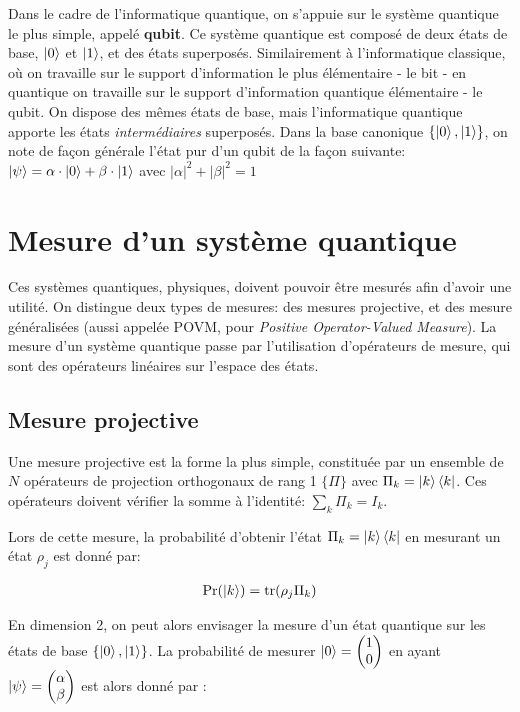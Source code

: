 \medbreak

Dans le cadre de l'informatique quantique, on s'appuie sur le système quantique le plus simple, appelé \textbf{qubit}. Ce système quantique est composé de deux états de base, $\ket{0}$ et $\ket{1}$, et des états superposés. Similairement à l'informatique classique, où on travaille sur le support d'information le plus élémentaire - le bit - en quantique on travaille sur le support d'information quantique élémentaire - le qubit. On dispose des mêmes états de base, mais l'informatique quantique apporte les états \textit{intermédiaires} superposés. Dans la base canonique $\{\ket{0}, \ket{1}\}$, on note de façon générale l'état pur d'un qubit de la façon suivante: $\ket{\psi} = \alpha \cdot \ket{0} + \beta \cdot \ket{1}$ avec $|\alpha|^2 + |\beta|^2 = 1$

\section{Mesure d'un système quantique}

Ces systèmes quantiques, physiques, doivent pouvoir être mesurés afin d'avoir une utilité. On distingue deux types de mesures: des mesures projective, et des mesure généralisées (aussi appelée POVM, pour \textit{Positive Operator-Valued Measure}). La mesure d'un système quantique passe par l'utilisation d'opérateurs de mesure, qui sont des opérateurs linéaires sur l'espace des états.

\subsection*{Mesure projective}

Une mesure projective est la forme la plus simple, constituée par un ensemble de $N$ opérateurs de projection orthogonaux de rang 1 $\{\Pi\}$ avec $\Pi_k = \ket{k} \bra{k}$. Ces opérateurs doivent vérifier la somme à l'identité: $\displaystyle \sum_k \Pi_k = I_k$. 

Lors de cette mesure, la probabilité d'obtenir l'état $\Pi_k = \ket{k}\bra{k}$ en mesurant un état $\rho_j$ est donné par:

\begin{align}
    \Pr(\ket{k}) = \operatorname{tr}(\rho_j \Pi_k)
\end{align}

En dimension 2, on peut alors envisager la mesure d'un état quantique sur les états de base $\{\ket{0}, \ket{1}\}$. La probabilité de mesurer $\ket{0} = \begin{pmatrix} 1 \\ 0 \end{pmatrix}$ en ayant $\ket{\psi} = \begin{pmatrix} \alpha \\ \beta \end{pmatrix}$ est alors donné par :

